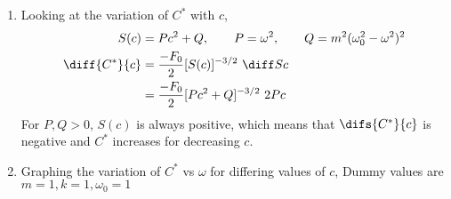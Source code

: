 \begin{enumerate}
\begin{enumerate}
              \item Looking at the variation of $ C^{*} $ with $ c $,
                    \begin{align}
                        S(c)             & = Pc^{2} + Q, \qquad P = \omega^{2}, \qquad Q = m^{2}(\omega_{0}^{2} - \omega^{2})^{2} \\
                        \diff {C^{*}}{c} & = \frac{-F_{0}}{2} [S(c)]^{-3/2}\ \diff Sc                                             \\
                                         & = \frac{-F_{0}}{2} [Pc^{2} + Q]^{-3/2}\ 2Pc                                            \\
                    \end{align}
                    For $ P, Q > 0 $, $ S(c) $ is always positive, which means that $ \difs {C^{*}}{c} $
                    is negative and $ C^{*} $ increases for decreasing $ c $.

              \item Graphing the variation of $ C^{*} $ vs $ \omega $ for differing values of $ c $,
                    Dummy values are $ m = 1, k = 1, \omega_{0} = 1 $


\end{enumerate}
\end{enumerate}
